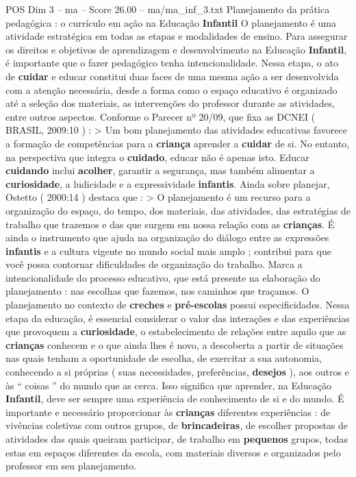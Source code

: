 \begin{textsample}{POS Dim 3 – ma – Score 26.00 – ma/ma\_inf\_3.txt}  \label{ex:f3_pos_142}
Planejamento da prática pedagógica : o currículo em ação na Educação \textbf{Infantil} O planejamento é uma atividade estratégica em todas as etapas e modalidades de ensino.
Para assegurar os direitos e objetivos de aprendizagem e desenvolvimento na Educação \textbf{Infantil}, é importante que o fazer pedagógico tenha intencionalidade.
Nessa etapa, o ato de \textbf{cuidar} e educar constitui duas faces de uma mesma ação a ser desenvolvida com a atenção necessária, desde a forma como o espaço educativo é organizado até a seleção dos materiais, as intervenções do professor durante as atividades, entre outros aspectos.
Conforme o Parecer nº 20/09, que fixa as DCNEI ( BRASIL, 2009:10 ) : > Um bom planejamento das atividades educativas favorece a formação de competências para a \textbf{criança} aprender a \textbf{cuidar} de si.
No entanto, na perspectiva que integra o \textbf{cuidado}, educar não é apenas isto.
Educar \textbf{cuidando} inclui \textbf{acolher}, garantir a segurança, mas também alimentar a \textbf{curiosidade}, a ludicidade e a expressividade \textbf{infantis}.
Ainda sobre planejar, Ostetto ( 2000:14 ) destaca que : > O planejamento é um recurso para a organização do espaço, do tempo, dos materiais, das atividades, das estratégias de trabalho que trazemos e das que surgem em nossa relação com as \textbf{crianças}.
É ainda o instrumento que ajuda na organização do diálogo entre as expressões \textbf{infantis} e a cultura vigente no mundo social mais amplo ; contribui para que você possa contornar dificuldades de organização do trabalho.
Marca a intencionalidade do processo educativo, que está presente na elaboração do planejamento : nas escolhas que fazemos, nos caminhos que traçamos.
O planejamento no contexto de \textbf{creches} e \textbf{pré-escolas} possui especificidades.
Nessa etapa da educação, é essencial considerar o valor das interações e das experiências que provoquem a \textbf{curiosidade}, o estabelecimento de relações entre aquilo que as \textbf{crianças} conhecem e o que ainda lhes é novo, a descoberta a partir de situações nas quais tenham a oportunidade de escolha, de exercitar a sua autonomia, conhecendo a si próprias ( suas necessidades, preferências, \textbf{desejos} ), aos outros e às “ coisas ” do mundo que as cerca.
Isso significa que aprender, na Educação \textbf{Infantil}, deve ser sempre uma experiência de conhecimento de si e do mundo.
É importante e necessário proporcionar às \textbf{crianças} diferentes experiências : de vivências coletivas com outros grupos, de \textbf{brincadeiras}, de escolher propostas de atividades das quais queiram participar, de trabalho em \textbf{pequenos} grupos, todas estas em espaços diferentes da escola, com materiais diversos e organizados pelo professor em seu planejamento.

\end{textsample}
